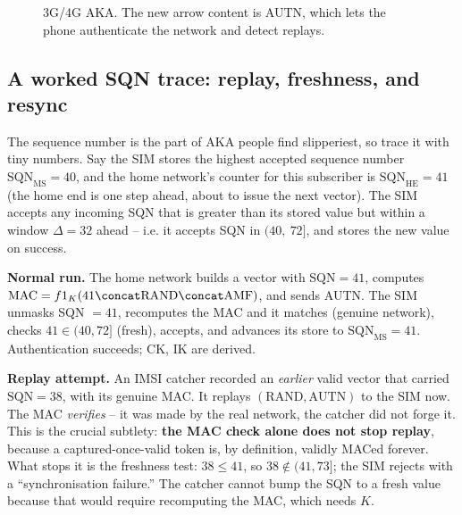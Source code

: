 \begin{figure}[H]
\centering
{}
\caption{3G/4G AKA. The new arrow content is AUTN, which lets the phone authenticate the network and detect replays.}
\label{ch29:fig-aka}
\end{figure}

\subsection{A worked SQN trace: replay, freshness, and resync}
\label{ch29:aka-sqn}

The sequence number is the part of AKA people find slipperiest, so trace it with tiny numbers. Say the SIM stores the highest accepted sequence number $\text{SQN}_{\text{MS}} = 40$, and the home network's counter for this subscriber is $\text{SQN}_{\text{HE}} = 41$ (the home end is one step ahead, about to issue the next vector). The SIM accepts any incoming SQN that is greater than its stored value but within a window $\Delta = 32$ ahead -- i.e. it accepts SQN in $(40,\ 72]$, and stores the new value on success.

\textbf{Normal run.} The home network builds a vector with $\text{SQN}=41$, computes $\text{MAC}=f1_K(41\concat\text{RAND}\concat\text{AMF})$, and sends AUTN. The SIM unmasks SQN $=41$, recomputes the MAC and it matches (genuine network), checks $41 \in (40,72]$ (fresh), accepts, and advances its store to $\text{SQN}_{\text{MS}}=41$. Authentication succeeds; CK, IK are derived.

\textbf{Replay attempt.} An IMSI catcher recorded an \emph{earlier} valid vector that carried $\text{SQN}=38$, with its genuine MAC. It replays $(\text{RAND}, \text{AUTN})$ to the SIM now. The MAC \emph{verifies} -- it was made by the real network, the catcher did not forge it. This is the crucial subtlety: \textbf{the MAC check alone does not stop replay}, because a captured-once-valid token is, by definition, validly MACed forever. What stops it is the freshness test: $38 \le 41$, so $38 \notin (41,73]$; the SIM rejects with a ``synchronisation failure.'' The catcher cannot bump the SQN to a fresh value because that would require recomputing the MAC, which needs $K$.

